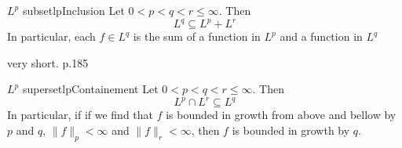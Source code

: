 \documentclass[oneside]{book}
\newcommand{\sse}{\subseteq}
\begin{document}
\begin{prop}{$L^p$ subset}{lpInclusion}
	Let $0 < p < q < r \le \infty$. Then
	\[
		L^q \sse L^p + L^r
	\]
	In particular, each $f \in L^q$ is the sum of a function in $L^p$ and a function in $L^q$
\end{prop}

\begin{Proof}
	very short. p.185
\end{Proof}

\begin{prop}{$L^p$ superset}{lpContainement}
	Let $0 < p < q < r \le \infty$. Then
	\[
		L^p \cap L^r \sse L^q
	\]
	In particular, if if we find that $f$ is bounded in growth from above and bellow by $p$ and $q$, $\|f\|_p < \infty$ and $\|f\|_r
	< \infty$, then $f$ is bounded in growth by $q$. 

\end{prop}
\end{document}
